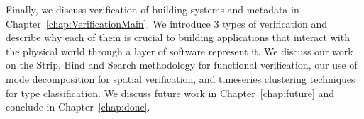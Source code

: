 Finally, we discuss verification of building systems and metadata in Chapter~\ref{chap:VerificationMain}.  We introduce 3 types of 
verification and describe why each of them is crucial to building applications that interact with the physical world through
a layer of software represent it.  We discuss our work on the Strip, Bind and Search methodology for functional verification, 
our use of mode decomposition for spatial verification, and timeseries clustering techniques for type classification.  
We discuss future work in Chapter~\ref{chap:future} and conclude in Chapter~\ref{chap:done}.




























